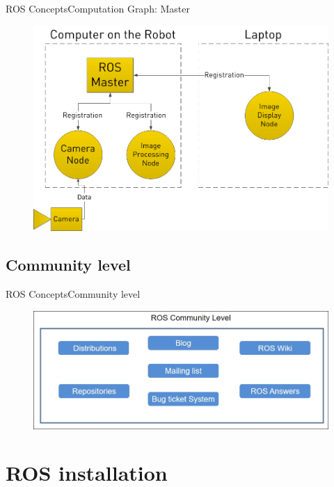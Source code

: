 \documentclass{beamer}
\begin{document}
\begin{frame}{ROS Concepts}{Computation Graph: Master}
\begin{figure}
\centering
\includegraphics[scale=0.3]{figs/img/nodeseg}
\end{figure}
\end{frame}


\subsection{Community level}

\begin{frame}{ROS Concepts}{Community level}
\begin{figure}
\centering
\includegraphics[scale=0.5]{figs/img/community}
\end{figure}
  
\end{frame}


\section{ROS installation}
	
\end{document}

